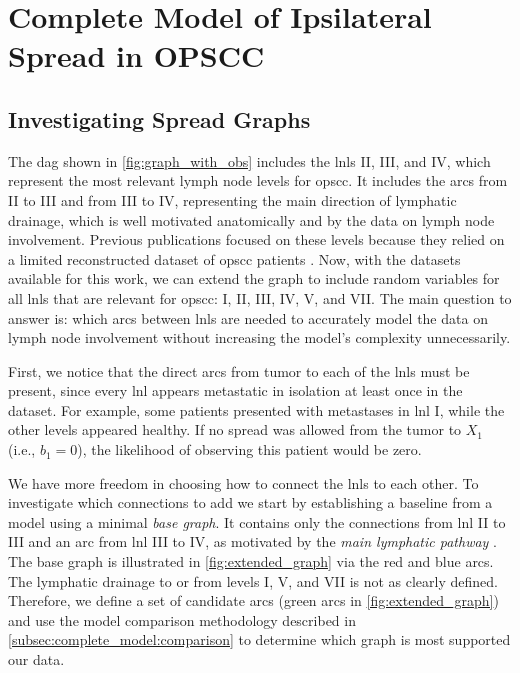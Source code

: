 \documentclass[twocolumn]{aastex631}
\begin{document}
\section{Complete Model of Ipsilateral Spread in OPSCC}
\label{sec:complete_model}

\subsection{Investigating Spread Graphs}
\label{subsec:complete_model:graphs}

The \gls{dag} shown in \autoref{fig:graph_with_obs} includes the \glspl{lnl} II, III, and IV, which represent the most relevant lymph node levels for \gls{opscc}. It includes the arcs from II to III and from III to IV, representing the main direction of lymphatic drainage, which is well motivated anatomically and by the data on lymph node involvement. Previous publications  \citep{pouymayou_bayesian_2019,ludwig_hidden_2021} focused on these levels because they relied on a limited reconstructed dataset of \gls{opscc} patients \citep{sanguineti_defining_2009}. Now, with the datasets available for this work, we can extend the graph to include random variables for all \glspl{lnl} that are relevant for \gls{opscc}: I, II, III, IV, V, and VII. The main question to answer is: which arcs between \glspl{lnl} are needed to accurately model the data on lymph node involvement without increasing the model's complexity unnecessarily.

First, we notice that the direct arcs from tumor to each of the \glspl{lnl} must be present, since every \gls{lnl} appears metastatic in isolation at least once in the dataset. For example, some patients presented with metastases in \gls{lnl} I, while the other levels appeared healthy. If no spread was allowed from the tumor to $X_1$ (i.e., $b_1 = 0$), the likelihood of observing this patient would be zero.

We have more freedom in choosing how to connect the \glspl{lnl} to each other. To investigate which connections to add we start by establishing a baseline from a model using a minimal \emph{base graph}. It contains only the connections from \gls{lnl} II to III and an arc from \gls{lnl} III to IV, as motivated by the \emph{main lymphatic pathway} \citep{lengele_anatomical_2007}. The base graph is illustrated in \autoref{fig:extended_graph} via the red and blue arcs. The lymphatic drainage to or from levels I, V, and VII is not as clearly defined. Therefore, we define a set of candidate arcs (green arcs in \autoref{fig:extended_graph}) and use the model comparison methodology described in \autoref{subsec:complete_model:comparison} to determine which graph is most supported our data. 
\end{document}

